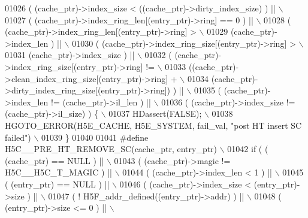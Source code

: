 \begin{DoxyCode}
01026 \textcolor{preprocessor}{     ( (cache\_ptr)->index\_size < ((cache\_ptr)->dirty\_index\_size) ) ||   \(\backslash\)}
01027 \textcolor{preprocessor}{     ( (cache\_ptr)->index\_ring\_len[(entry\_ptr)->ring] == 0 ) ||         \(\backslash\)}
01028 \textcolor{preprocessor}{     ( (cache\_ptr)->index\_ring\_len[(entry\_ptr)->ring] >                 \(\backslash\)}
01029 \textcolor{preprocessor}{       (cache\_ptr)->index\_len ) ||                                      \(\backslash\)}
01030 \textcolor{preprocessor}{     ( (cache\_ptr)->index\_ring\_size[(entry\_ptr)->ring] >                \(\backslash\)}
01031 \textcolor{preprocessor}{       (cache\_ptr)->index\_size ) ||                                     \(\backslash\)}
01032 \textcolor{preprocessor}{     ( (cache\_ptr)->index\_ring\_size[(entry\_ptr)->ring] !=               \(\backslash\)}
01033 \textcolor{preprocessor}{       ((cache\_ptr)->clean\_index\_ring\_size[(entry\_ptr)->ring] +         \(\backslash\)}
01034 \textcolor{preprocessor}{        (cache\_ptr)->dirty\_index\_ring\_size[(entry\_ptr)->ring]) ) ||     \(\backslash\)}
01035 \textcolor{preprocessor}{     ( (cache\_ptr)->index\_len != (cache\_ptr)->il\_len ) ||               \(\backslash\)}
01036 \textcolor{preprocessor}{     ( (cache\_ptr)->index\_size != (cache\_ptr)->il\_size) ) \{             \(\backslash\)}
01037 \textcolor{preprocessor}{    HDassert(FALSE);                                                    \(\backslash\)}
01038 \textcolor{preprocessor}{    HGOTO\_ERROR(H5E\_CACHE, H5E\_SYSTEM, fail\_val, "post HT insert SC failed") \(\backslash\)}
01039 \textcolor{preprocessor}{\}}
01040 
01041 \textcolor{preprocessor}{#define H5C\_\_PRE\_HT\_REMOVE\_SC(cache\_ptr, entry\_ptr)                     \(\backslash\)}
01042 \textcolor{preprocessor}{if ( ( (cache\_ptr) == NULL ) ||                                         \(\backslash\)}
01043 \textcolor{preprocessor}{     ( (cache\_ptr)->magic != H5C\_\_H5C\_T\_MAGIC ) ||                      \(\backslash\)}
01044 \textcolor{preprocessor}{     ( (cache\_ptr)->index\_len < 1 ) ||                                  \(\backslash\)}
01045 \textcolor{preprocessor}{     ( (entry\_ptr) == NULL ) ||                                         \(\backslash\)}
01046 \textcolor{preprocessor}{     ( (cache\_ptr)->index\_size < (entry\_ptr)->size ) ||                 \(\backslash\)}
01047 \textcolor{preprocessor}{     ( ! H5F\_addr\_defined((entry\_ptr)->addr) ) ||                       \(\backslash\)}
01048 \textcolor{preprocessor}{     ( (entry\_ptr)->size <= 0 ) ||                                      \(\backslash\)}

\end{DoxyCode}
